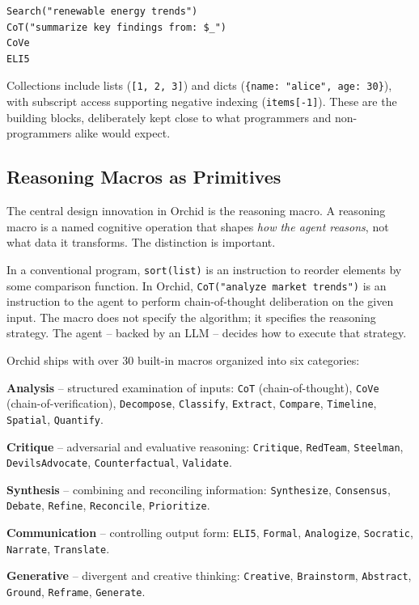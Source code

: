 \documentclass[11pt,a4paper]{article}
\begin{document}
\begin{lstlisting}[language=orchid]
Search("renewable energy trends")
CoT("summarize key findings from: $_")
CoVe
ELI5
\end{lstlisting}

Collections include lists (\texttt{[1, 2, 3]}) and dicts (\texttt{\{name: "alice", age: 30\}}), with subscript access supporting negative indexing (\texttt{items[-1]}). These are the building blocks, deliberately kept close to what programmers and non-programmers alike would expect.

\subsection{Reasoning Macros as Primitives}

The central design innovation in Orchid is the reasoning macro. A reasoning macro is a named cognitive operation that shapes \emph{how the agent reasons}, not what data it transforms. The distinction is important.

In a conventional program, \texttt{sort(list)} is an instruction to reorder elements by some comparison function. In Orchid, \texttt{CoT("analyze market trends")} is an instruction to the agent to perform chain-of-thought deliberation on the given input. The macro does not specify the algorithm; it specifies the reasoning strategy. The agent -- backed by an LLM -- decides how to execute that strategy.

Orchid ships with over 30 built-in macros organized into six categories:

\textbf{Analysis} -- structured examination of inputs: \texttt{CoT} (chain-of-thought), \texttt{CoVe} (chain-of-verification), \texttt{Decompose}, \texttt{Classify}, \texttt{Extract}, \texttt{Compare}, \texttt{Timeline}, \texttt{Spatial}, \texttt{Quantify}.

\textbf{Critique} -- adversarial and evaluative reasoning: \texttt{Critique}, \texttt{RedTeam}, \texttt{Steelman}, \texttt{DevilsAdvocate}, \texttt{Counterfactual}, \texttt{Validate}.

\textbf{Synthesis} -- combining and reconciling information: \texttt{Synthesize}, \texttt{Consensus}, \texttt{Debate}, \texttt{Refine}, \texttt{Reconcile}, \texttt{Prioritize}.

\textbf{Communication} -- controlling output form: \texttt{ELI5}, \texttt{Formal}, \texttt{Analogize}, \texttt{Socratic}, \texttt{Narrate}, \texttt{Translate}.

\textbf{Generative} -- divergent and creative thinking: \texttt{Creative}, \texttt{Brainstorm}, \texttt{Abstract}, \texttt{Ground}, \texttt{Reframe}, \texttt{Generate}.
\end{document}
